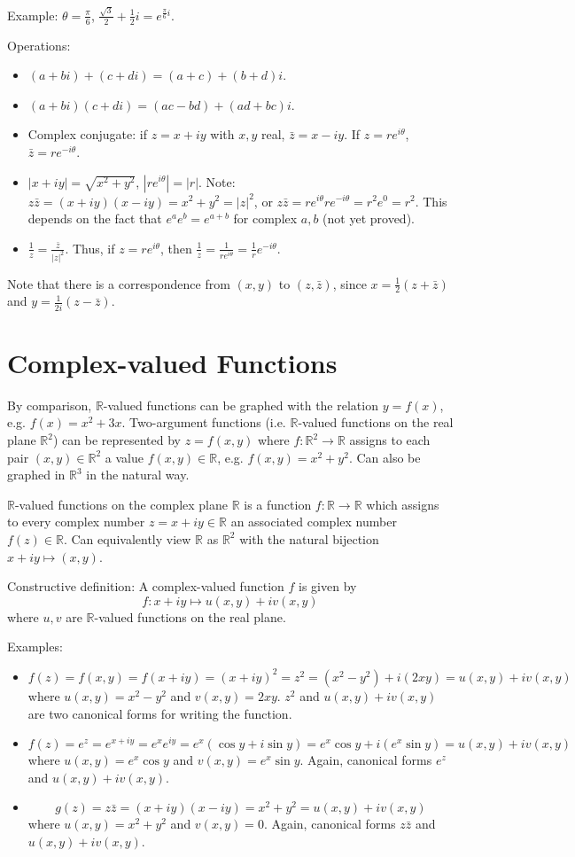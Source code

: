 \documentclass{artikel3}
\newcommand{\abs}[1]{\left|#1\right|}
\newcommand{\reals}{\mathbb{R}}
\newcommand{\complex}{\mathbb{R}}
\begin{document}
Example: $\theta=\frac{\pi}{6}$, $\frac{\sqrt{3}}{2}+\frac{1}{2}i=e^{\frac{\pi}{6}i}$.

Operations:
\begin{itemize}
	\item $(a+bi)+(c+di)=(a+c)+(b+d)i$.
	\item $(a+bi)(c+di)=(ac-bd)+(ad+bc)i$.
	\item Complex conjugate: if $z=x+iy$ with $x,y$ real, $\bar{z}=x-iy$.
		If $z=re^{i\theta}$, $\bar{z}=re^{-i\theta}$.
	\item $\abs{x+iy}=\sqrt{x^2+y^2}$, $\abs{re^{i\theta}}=\abs{r}$.
		Note: $z\bar{z}=(x+iy)(x-iy)=x^2+y^2=\abs{z}^2$, or
			$z\bar{z}=re^{i\theta}re^{-i\theta}=r^2e^{0}=r^2$.
		This depends on the fact that $e^{a}e^{b}=e^{a+b}$ for complex $a,b$ (not
		yet proved).
	\item
		$\frac{1}{z} = \frac{\bar{z}}{\abs{z}^2}$.  Thus, if $z=re^{i\theta}$,
		then $\frac{1}{z}=\frac{1}{re^{i\theta}}=\frac{1}{r}e^{-i\theta}$.
\end{itemize}

Note that there is a correspondence from $(x,y)$ to
$(z,\bar{z})$, since $x=\frac{1}{2}(z+\bar{z})$ and $y=\frac{1}{2i}(z-\bar{z})$.

\section{Complex-valued Functions}
By comparison, $\reals$-valued functions can be graphed with the relation
$y=f(x)$, e.g. $f(x)=x^2+3x$.  Two-argument functions (i.e.
$\reals$-valued functions on the real plane $\reals^2$) can
be represented by $z=f(x,y)$ where $f:\reals^2\to \reals$ assigns
to each pair $(x,y)\in\reals^2$ a value $f(x,y)\in\reals$, e.g.
$f(x,y)=x^2+y^2$.  Can
also be graphed in $\reals^3$ in the natural way.

$\complex$-valued functions on the complex plane $\complex$ is
a function $f:\complex\to\complex$ which assigns to every
complex number $z=x+iy\in\complex$ an associated complex
number $f(z)\in\complex$.  Can equivalently view $\complex$ as
$\reals^2$ with the natural bijection $x+iy\mapsto (x,y)$.

Constructive definition:
A complex-valued function $f$ is given by \[
	f:x+iy\mapsto u(x,y)+iv(x,y)
\] where $u,v$ are $\reals$-valued functions on the real plane.

Examples:
\begin{itemize}
	\item \[
			f(z)=f(x,y)=f(x+iy)=(x+iy)^2=z^2=(x^2-y^2)+i(2xy)=u(x,y)+iv(x,y)
		\] where $u(x,y)=x^2-y^2$ and $v(x,y)=2xy$.
		$z^2$ and $u(x,y)+iv(x,y)$ are two canonical forms for writing the function.
	\item \[
			f(z)=e^z=e^{x+iy}=e^xe^{iy}=e^x(\cos y+i\sin y)=e^x\cos y+i(e^x\sin y)
			= u(x,y)+iv(x,y)
		\] where $u(x,y)=e^x\cos y$ and $v(x,y)=e^x\sin y$.  Again, canonical
		forms $e^z$ and $u(x,y)+iv(x,y)$.
	\item \[
			g(z)=z\bar{z} = (x+iy)(x-iy)=x^2+y^2=u(x,y)+iv(x,y)
		\] where $u(x,y)=x^2+y^2$ and $v(x,y)=0$.  Again, canonical
		forms $z\bar{z}$ and $u(x,y)+iv(x,y)$.
\end{itemize}
\end{document}
